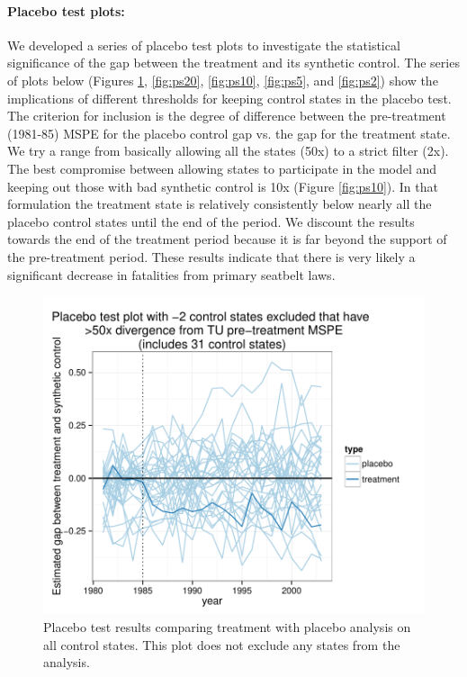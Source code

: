 \paragraph{Placebo test plots:}  We developed a series of placebo test plots to investigate the statistical significance of the gap between the treatment and its synthetic control.  The series of plots below (Figures \ref{fig:ps50}, \ref{fig:ps20}, \ref{fig:ps10}, \ref{fig:ps5}, and \ref{fig:ps2}) show the implications of different thresholds for keeping control states in the placebo test.  The criterion for inclusion is the degree of difference between the pre-treatment (1981-85) MSPE for the placebo control gap vs. the gap for the treatment state.  We try a range from basically allowing all the states (50x) to a strict filter (2x).  The best compromise between allowing states to participate in the model and keeping out those with bad synthetic control is 10x (Figure \ref{fig:ps10}).  In that formulation the treatment state is relatively consistently below nearly all the placebo control states until the end of the period.  We discount the results towards the end of the treatment period because it is far beyond the support of the pre-treatment period.  These results indicate that there is very likely a significant decrease in fatalities from primary seatbelt laws.  

\begin{figure}[htbp]
\begin{center}
\includegraphics{img-placeboTest50.pdf}
\caption{Placebo test results comparing treatment with placebo analysis on all control states.  This plot does not exclude any states from the analysis.}
\label{fig:ps50}
\end{center}
\end{figure}

